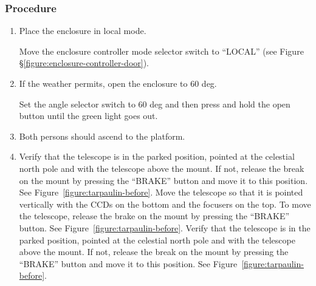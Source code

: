 \subsubsection{Procedure}

\begin{enumerate}

    \item
        Place the enclosure in local mode.

        Move the enclosure controller mode selector switch to “LOCAL” (see Figure \S\ref{figure:enclosure-controller-door}).
    \item
        If the weather permits, open the enclosure to 60 deg.

        Set the angle selector switch to 60 deg and then press and hold the open button until the green light goes out.

    \item
        Both persons should ascend to the platform.

    \item
        \ifcoatli
        Verify that the telescope is in the parked position, pointed at the celestial north pole and with the telescope above the mount. If not, release the break on the mount by pressing the “BRAKE” button and move it to this position. See Figure~\ref{figure:tarpaulin-before}.
        \fi
        \ifddoti
        Move the telescope so that it is pointed vertically with the CCDs on the bottom and the focusers on the top. To move the telescope, release the brake on the mount by pressing the “BRAKE” button. See Figure~\ref{figure:tarpaulin-before}.
        \fi
        \ifquetzalcoatl
        Verify that the telescope is in the parked position, pointed at the celestial north pole and with the telescope above the mount. If not, release the break on the mount by pressing the “BRAKE” button and move it to this position. See Figure~\ref{figure:tarpaulin-before}.
        \fi


\end{enumerate}
